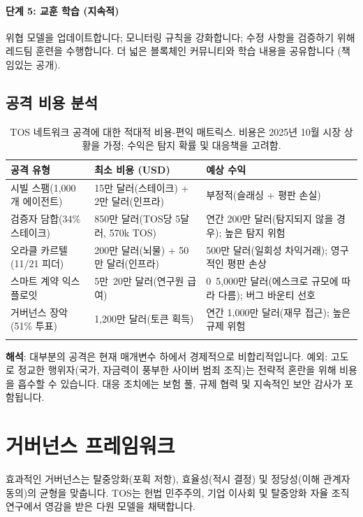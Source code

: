 \documentclass[11pt]{article}
\begin{document}
\paragraph{단계 5: 교훈 학습 (지속적)}
위협 모델을 업데이트합니다; 모니터링 규칙을 강화합니다; 수정 사항을 검증하기 위해 레드팀 훈련을 수행합니다. 더 넓은 블록체인 커뮤니티와 학습 내용을 공유합니다 (책임있는 공개).

\subsection{공격 비용 분석}

\begin{longtable}{@{}p{}p{}p{}@{}}
\toprule
\textbf{공격 유형} & \textbf{최소 비용 (USD)} & \textbf{예상 수익} \\\midrule
시빌 스팸(1,000개 에이전트) & 15만 달러(스테이크) + 2만 달러(인프라) & 부정적(슬래싱 + 평판 손실) \\
검증자 담합(34\% 스테이크) & 850만 달러(TOS당 5달러, 570k TOS) & 연간 200만 달러(탐지되지 않을 경우); 높은 탐지 위험 \\
오라클 카르텔(11/21 피더) & 200만 달러(뇌물) + 50만 달러(인프라) & 500만 달러(일회성 차익거래); 영구적인 평판 손상 \\
스마트 계약 익스플로잇 & 5만~20만 달러(연구원 급여) & 0~5,000만 달러(에스크로 규모에 따라 다름); 버그 바운티 선호 \\
거버넌스 장악(51\% 투표) & 1,200만 달러(토큰 획득) & 연간 1,000만 달러(재무 접근); 높은 규제 위험 \\
\bottomrule
\caption{TOS 네트워크 공격에 대한 적대적 비용-편익 매트릭스. 비용은 2025년 10월 시장 상황을 가정; 수익은 탐지 확률 및 대응책을 고려함.}
\end{longtable}

\textbf{해석}: 대부분의 공격은 현재 매개변수 하에서 경제적으로 비합리적입니다. 예외: 고도로 정교한 행위자(국가, 자금력이 풍부한 사이버 범죄 조직)는 전략적 혼란을 위해 비용을 흡수할 수 있습니다. 대응 조치에는 보험 풀, 규제 협력 및 지속적인 보안 감사가 포함됩니다.

\section{거버넌스 프레임워크}
\label{sec:governance}

효과적인 거버넌스는 탈중앙화(포획 저항), 효율성(적시 결정) 및 정당성(이해 관계자 동의)의 균형을 맞춥니다. TOS는 헌법 민주주의, 기업 이사회 및 탈중앙화 자율 조직 연구에서 영감을 받은 다원 모델을 채택합니다.
\end{document}
